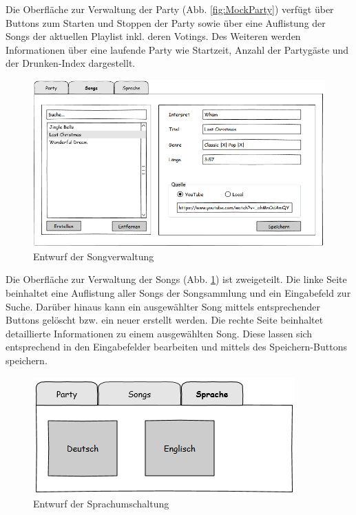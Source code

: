 Die Oberfläche zur Verwaltung der Party (Abb. \ref{fig:MockParty}) verfügt über Buttons zum Starten und Stoppen der Party sowie über eine Auflistung der Songs der aktuellen Playlist inkl. deren Votings. Des Weiteren werden Informationen über eine laufende Party wie Startzeit, Anzahl der Partygäste und der Drunken-Index dargestellt.

\begin{figure}[H]
\centering
\includegraphics[width=1\linewidth]{Bilder/MockSongVerwaltung}
\caption{Entwurf der Songverwaltung}
\label{fig:MockSongVerwaltung}
\end{figure}

Die Oberfläche zur Verwaltung der Songs (Abb. \ref{fig:MockSongVerwaltung}) ist zweigeteilt. Die linke Seite beinhaltet eine Auflistung aller Songs der Songsammlung und ein Eingabefeld zur Suche. Darüber hinaus kann ein ausgewählter Song mittels entsprechender Buttons gelöscht bzw. ein neuer erstellt werden. Die rechte Seite 
beinhaltet detaillierte Informationen zu einem ausgewählten Song. Diese lassen sich entsprechend in den Eingabefelder bearbeiten und mittels des Speichern-Buttons speichern.

\begin{figure}[H]
\centering
\includegraphics[width=0.6\linewidth]{Bilder/MockSprachen}
\caption{Entwurf der Sprachumschaltung}
\label{fig:MockSprachen}
\end{figure}

